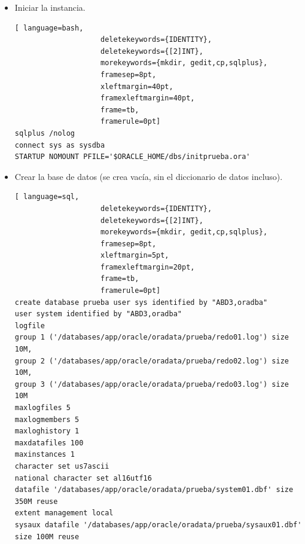 \begin{itemize}
\begin{lstlisting}[ language=bash,
                    deletekeywords={IDENTITY},
                    deletekeywords={[2]INT},
                    morekeywords={mkdir, gedit,cp,df},
                    framesep=8pt,
                    xleftmargin=40pt,
                    framexleftmargin=40pt,
                    frame=tb,
                    framerule=0pt]
cp $ORACLE_BASE/admin/oradba/pfile/init.ora $ORACLE_HOME/dbs/initprueba.ora
# reemplazar todas las apariciones de 'oradba' por 'prueba'
gedit $ORACLE_HOME/dbs/initprueba.ora
# carpeta para los ficheros de control
mkdir $ORACLE_BASE/oradata/prueba
# carpeta para auditorias
mkdir $ORACLE_BASE/admin/prueba
mkdir $ORACLE_BASE/admin/prueba/adump
# comprobar espacio disponible para los pasos que quedan
cd $ORACLE_HOME/dbs
df -h
\end{lstlisting}
\item Iniciar la instancia.
\begin{lstlisting}[ language=bash,
                    deletekeywords={IDENTITY},
                    deletekeywords={[2]INT},
                    morekeywords={mkdir, gedit,cp,sqlplus},
                    framesep=8pt,
                    xleftmargin=40pt,
                    framexleftmargin=40pt,
                    frame=tb,
                    framerule=0pt]
sqlplus /nolog
connect sys as sysdba
STARTUP NOMOUNT PFILE='$ORACLE_HOME/dbs/initprueba.ora'
\end{lstlisting}
\item Crear la base de datos (se crea vacía, sin el diccionario de datos incluso).
\begin{lstlisting}[ language=sql,
                    deletekeywords={IDENTITY},
                    deletekeywords={[2]INT},
                    morekeywords={mkdir, gedit,cp,sqlplus},
                    framesep=8pt,
                    xleftmargin=5pt,
                    framexleftmargin=20pt,
                    frame=tb,
                    framerule=0pt]
create database prueba user sys identified by "ABD3,oradba"
user system identified by "ABD3,oradba"
logfile
group 1 ('/databases/app/oracle/oradata/prueba/redo01.log') size 10M,
group 2 ('/databases/app/oracle/oradata/prueba/redo02.log') size 10M,
group 3 ('/databases/app/oracle/oradata/prueba/redo03.log') size 10M
maxlogfiles 5
maxlogmembers 5
maxloghistory 1
maxdatafiles 100
maxinstances 1
character set us7ascii
national character set al16utf16
datafile '/databases/app/oracle/oradata/prueba/system01.dbf' size 350M reuse
extent management local
sysaux datafile '/databases/app/oracle/oradata/prueba/sysaux01.dbf' size 100M reuse 

\end{lstlisting}
\end{itemize}
